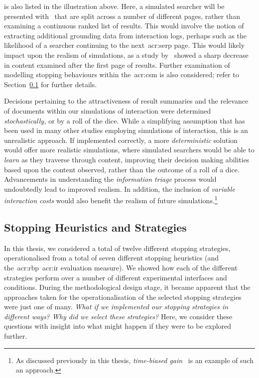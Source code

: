  is also listed in the illustration above. Here, a simulated searcher will be presented with~ that are split across a number of different pages, rather than examining a continuous ranked list of results. This would involve the notion of extracting additional grounding data from interaction logs, perhaps such as the likelihood of a searcher continuing to the next~\gls{acr:serp} page. This would likely impact upon the realism of simulations, as a study by~\cite{jansen2005analysis} showed a sharp decrease in content examined after the first page of results. Further examination of modelling stopping behaviours within the~\gls{acr:csm} is also considered; refer to Section~\ref{sec:conclusions:future:stopping} for further details.

 Decisions pertaining to the attractiveness of result summaries and the relevance of documents within our simulations of interaction were determined \emph{stochastically,} or by a roll of the dice. While a simplifying assumption that has been used in many other studies employing simulations of interaction, this is an unrealistic approach. If implemented correctly, a more \emph{deterministic} solution would offer more realistic simulations, where simulated searchers would be able to \emph{learn} as they traverse through content, improving their decision making abilities based upon the content observed, rather than the outcome of a roll of a dice. Advancements in understanding the \emph{information triage} process would undoubtedly lead to improved realism. In addition, the inclusion of \emph{variable interaction costs} would also benefit the realism of future simulations.\footnote{As discussed previously in this thesis, \emph{time-biased gain}~\citep{smucker2012tbg} is an example of such an approach.}

\subsection{Stopping Heuristics and Strategies}\label{sec:conclusions:future:stopping}
In this thesis, we considered a total of twelve different stopping strategies, operationalised from a total of seven different stopping heuristics (and the~\gls{acr:rbp}~\gls{acr:ir} evaluation measure). We showed how each of the different strategies perform over a number of different experimental interfaces and conditions. During the methodological design stage, it became apparent that the approaches taken for the operationalisation of the selected stopping strategies were just one of many. \emph{What if we implemented our stopping strategies in different ways? Why did we select these strategies?} Here, we consider these questions with insight into what might happen if they were to be explored further.

